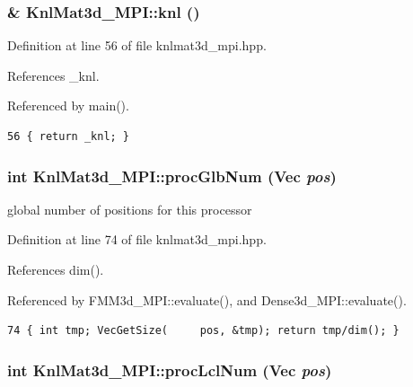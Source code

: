 \subsubsection{\& Knl\-Mat3d\_\-MPI::knl ()\hspace{0.3cm}{\tt  [inline]}}\label{classKnlMat3d__MPI_d01911fc223ab4bc9604db12f942194e_d01911fc223ab4bc9604db12f942194e}




Definition at line 56 of file knlmat3d\_\-mpi.hpp.

References \_\-knl.

Referenced by main().

\footnotesize\begin{verbatim}56 { return _knl; }
\end{verbatim}\normalsize 


\subsubsection{\setlength{\rightskip}{0pt plus 5cm}int Knl\-Mat3d\_\-MPI::proc\-Glb\-Num (Vec {\em pos})\hspace{0.3cm}{\tt  [inline]}}\label{classKnlMat3d__MPI_47cb2afea618c56a5cc6e05f4034a806_47cb2afea618c56a5cc6e05f4034a806}


global number of positions for this processor 

Definition at line 74 of file knlmat3d\_\-mpi.hpp.

References dim().

Referenced by FMM3d\_\-MPI::evaluate(), and Dense3d\_\-MPI::evaluate().

\footnotesize\begin{verbatim}74 { int tmp; VecGetSize(     pos, &tmp); return tmp/dim(); }
\end{verbatim}\normalsize 


\subsubsection{\setlength{\rightskip}{0pt plus 5cm}int Knl\-Mat3d\_\-MPI::proc\-Lcl\-Num (Vec {\em pos})\hspace{0.3cm}{\tt  [inline]}}\label{classKnlMat3d__MPI_21f80b863e1376ff6648d882fdabd08e_21f80b863e1376ff6648d882fdabd08e}


